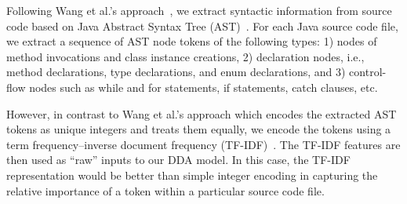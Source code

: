 Following Wang et al.'s approach~\cite{wang2016automatically}, we extract syntactic information from source code based on Java Abstract Syntax Tree (AST)~\cite{neamtiu2005understanding}. For each Java source code file, we extract a sequence of AST node tokens of the following types: 1) nodes of method invocations and class instance creations, 2) declaration nodes, i.e., method declarations, type declarations, and enum declarations, and 3) control-flow nodes such as while and for statements, if statements, catch clauses, etc. 

However, in contrast to Wang et al.'s approach which encodes the extracted AST tokens as unique integers and treats them equally, we encode the tokens using a term frequency--inverse document frequency (TF-IDF)~\cite{manning2008introduction}. The TF-IDF features are then used as ``raw'' inputs to our DDA model. In this case, the TF-IDF representation would be better than simple integer encoding in capturing the relative importance of a token within a particular source code file.




